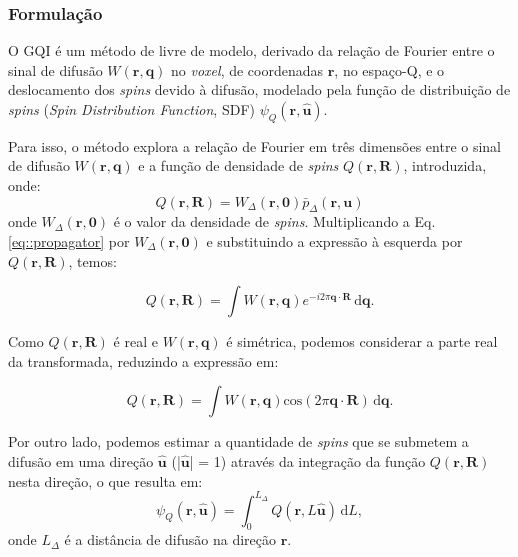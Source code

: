 \documentclass[
    12pt,                %
    oneside,            %
    a4paper,            %
    english,            %
    french,                %
    spanish,            %
    brazil                %
    ]{abntex2}
\begin{document}
\label{sec::gqi}
\subsubsection{Formulação}

O GQI é um método de livre de modelo, derivado da relação de Fourier entre o sinal de difusão $W(\mathbf{r},  \mathbf{q})$ no \textit{voxel}, de coordenadas $\mathbf{r}$, no espaço-Q, e o deslocamento dos \textit{spins} devido à difusão, modelado pela função de distribuição de \textit{spins} (\textit{Spin Distribution Function}, SDF) $\psi_Q(\mathbf{r}, \mathbf{\hat{u}})$.

Para isso, o método explora a relação de Fourier em três dimensões entre o sinal de difusão $W(\mathbf{r}, \mathbf{q})$ e a função de densidade de \textit{spins} $Q(\mathbf{r}, \mathbf{R})$, introduzida, onde:
\begin{equation}
\label{eq::spin_densidade_presentacao}
    Q(\mathbf{r}, \mathbf{R}) = W_{\Delta}(\mathbf{r}, \mathbf{0}) \bar{p}_{\Delta}(\mathbf{r}, \mathbf{u})
\end{equation}
onde $W_{\Delta}(\mathbf{r}, \mathbf{0})$ é o valor da densidade de \textit{spins}. Multiplicando a Eq. \ref{eq::propagator} por  $W_{\Delta}(\mathbf{r}, \mathbf{0})$ e substituindo a expressão à esquerda por $Q(\mathbf{r}, \mathbf{R})$, temos:


\begin{equation}
\label{eq::spin_diffsignal_1}
    Q(\mathbf{r}, \mathbf{R}) =
    \int \! W(\mathbf{r}, \mathbf{q})e^{-i2\pi \mathbf{q}\cdot \mathbf{R} } \,\mathrm{d}\mathbf{q} .
\end{equation}

Como $Q(\mathbf{r}, \mathbf{R})$ é real e $W(\mathbf{r}, \mathbf{q})$ é simétrica, podemos considerar a parte real da transformada, reduzindo a expressão em:

\begin{equation}
\label{eq::spin_diffsignal_2}
    Q(\mathbf{r}, \mathbf{R}) =
     \int \! W(\mathbf{r}, \mathbf{q})\text{cos}(2\pi \mathbf{q}\cdot \mathbf{R}) \,\mathrm{d}\mathbf{q} .
\end{equation}

Por outro lado, podemos estimar a quantidade de \textit{spins} que se submetem a difusão em uma direção $\mathbf{\hat{u}}$ (|$\mathbf{\hat{u}}$| = 1) através da integração da função $Q(\mathbf{r}, \mathbf{R})$ nesta direção, o que resulta em:
\begin{equation}
\label{eq::sdf_spin}
    \psi_Q(\mathbf{r}, \mathbf{\hat{u}}) =
   \int_{0}^{L_{\Delta}} Q(\mathbf{r}, L\mathbf{\hat{u}})\!  \,\mathrm{d}L , 
\end{equation}
onde $L_\Delta$ é a distância de difusão na direção  $\mathbf{r}$.
\end{document}
